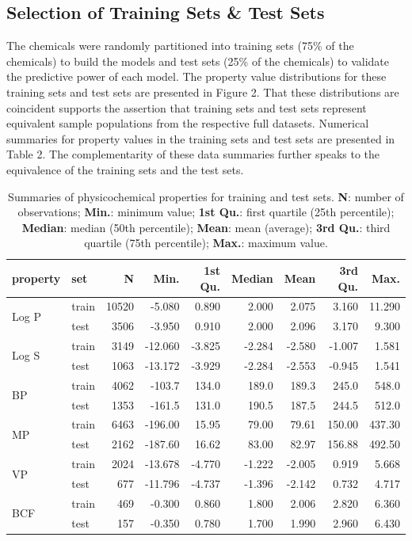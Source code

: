 \documentclass[10pt, letter]{article}
\renewcommand{\=}{\, =\, }
\newcommand{\+}{\, +\, }
\renewcommand{\-}{\, -\, }
\begin{document}
\subsection{Selection of Training Sets \& Test Sets}

The chemicals were randomly partitioned into training sets (75\% of the
chemicals) to build the models and test sets (25\% of the chemicals) to validate
the predictive power of each model. The property value distributions for these training sets and test sets are presented in Figure 2. That these distributions are coincident supports the assertion that training sets and test sets represent equivalent sample populations from the respective full datasets. Numerical summaries for property values in the training sets and test sets are presented in Table 2. The complementarity of these data summaries further speaks to the equivalence of the training sets and the test sets.

\begin{table}[H]
\begin{center}
\begin{tabular}{llrrrrrrr}
\toprule
{\bf property} & {\bf set} & {\bf N} & {\bf Min.} & {\bf 1st Qu.} &  {\bf Median}  & {\bf Mean}  & {\bf 3rd Qu.} & {\bf Max.}\\
\midrule
\multirow{2}{15mm}{Log P}
& train &  10520 & -5.080 & 0.890 & 2.000 & 2.075 & 3.160 & 11.290\\
& test &  3506 & -3.950 & 0.910 & 2.000 & 2.096 & 3.170 & 9.300\\
\midrule
\multirow{2}{15mm}{Log S}
& train &  3149 & -12.060 & -3.825 & -2.284 & -2.580 & -1.007 & 1.581\\
& test &  1063 & -13.172 & -3.929 & -2.284 & -2.553 & -0.945 & 1.541\\
\midrule
\multirow{2}{15mm}{BP}
& train &  4062 & -103.7 & 134.0 & 189.0 & 189.3 & 245.0 & 548.0\\
& test &  1353 & -161.5 & 131.0 & 190.5 & 187.5 & 244.5 & 512.0\\
\midrule
\multirow{2}{15mm}{MP}
& train &  6463 & -196.00 & 15.95 & 79.00 & 79.61 & 150.00 & 437.30\\
& test &  2162 & -187.60 & 16.62 & 83.00 & 82.97 & 156.88 & 492.50\\
\midrule
\multirow{2}{15mm}{VP}
& train &  2024 & -13.678 & -4.770 & -1.222 & -2.005 & 0.919 & 5.668\\
& test &  677 & -11.796 & -4.737 & -1.396 & -2.142 & 0.732 & 4.717\\
\midrule
\multirow{2}{15mm}{BCF}
& train &  469 & -0.300 & 0.860 & 1.800 & 2.006 & 2.820 & 6.360\\
& test &  157 & -0.350 & 0.780 & 1.700 & 1.990 & 2.960 & 6.430\\
\hline
\end{tabular}
\end{center}
\caption{Summaries of physicochemical properties for training and test sets. \textbf{N}: number of observations; \textbf{Min.}: minimum value; \textbf{1st Qu.}: first quartile (25th percentile);
\textbf{Median}: median (50th percentile); \textbf{Mean}: mean (average); \textbf{3rd Qu.}: third quartile (75th percentile);
\textbf{Max.}: maximum value.}
\end{table}
\end{document}
